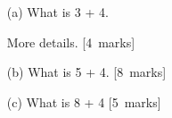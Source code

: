 %
%
%

\begin{itemize}

\item[(a)] What is 3 + 4.

More details. [4~marks]

\item[(b)] What is 5 + 4. [8~marks]

\item[(c)] What is 8 + 4 [5~marks]

\end{itemize}

%